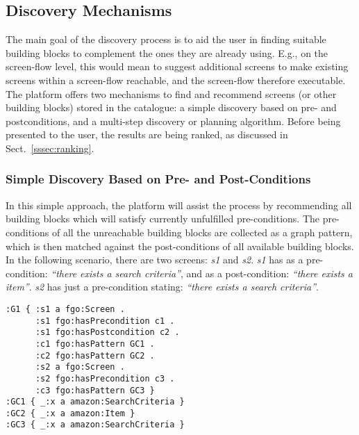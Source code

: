 
\subsection{Discovery Mechanisms} %
\label{ssec:discovery}


The main goal of the discovery process is to aid the user in finding suitable building blocks to complement the ones they are already using. E.g., on the screen-flow level, this would mean to suggest additional screens to make existing screens within a screen-flow reachable, and the screen-flow therefore executable.
The platform offers two mechanisms to find and recommend screens (or other building blocks) stored in the catalogue: a simple discovery based on pre- and postconditions, and a multi-step discovery or planning algorithm. 
Before being presented to the user, the results are being ranked, as discussed in Sect.~\ref{sssec:ranking}. 

\subsubsection{Simple Discovery Based on Pre- and Post-Conditions}
\label{sssec:simple_discovery}

In this simple approach, the platform will assist the process by recommending all building blocks which will satisfy currently unfulfilled pre-conditions. 
The pre-conditions of all the unreachable building blocks are collected as a graph pattern, which is then matched against the post-conditions of all available building blocks. 
In the following scenario, there are two 
screens: \emph{s1} and \emph{s2}. \emph{s1} has as a pre-condition: \emph{``there exists a search criteria''}, and as a 
post-condition: \emph{``there exists a item''}. \emph{s2} has just a pre-condition stating: \emph{``there exists a search criteria''}.

\begin{listing}
\begin{verbatim}
:G1 { :s1 a fgo:Screen .      
      :s1 fgo:hasPrecondition c1 .
      :s1 fgo:hasPostcondition c2 .
      :c1 fgo:hasPattern GC1 .
      :c2 fgo:hasPattern GC2 .
      :s2 a fgo:Screen .      
      :s2 fgo:hasPrecondition c3 .
      :c3 fgo:hasPattern GC3 }
:GC1 { _:x a amazon:SearchCriteria }
:GC2 { _:x a amazon:Item }
:GC3 { _:x a amazon:SearchCriteria }
\end{verbatim}
\label{lis:discovery_example}
\end{listing}

